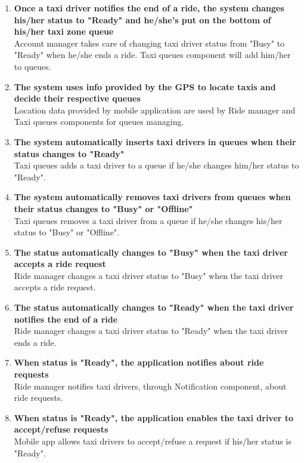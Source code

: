 \begin{enumerate}
	\item \textbf{Once a taxi driver notifies the end of a ride, the system changes his/her status to "Ready" and he/she's put on the bottom of his/her taxi zone queue}\\
	Account manager takes care of changing taxi driver status from "Busy" to "Ready" when he/she ends a ride. Taxi queues component will add him/her to queues.
	
	\item \textbf{The system uses info provided by the GPS to locate taxis and decide their respective queues}\\
	Location data provided by mobile application are used by Ride manager and Taxi queues components for queues managing.
	
	\item \textbf{The system automatically inserts taxi drivers in queues when their status changes to "Ready"}\\
	Taxi queues adds a taxi driver to a queue if he/she changes him/her status to "Ready".
	
	\item \textbf{The system automatically removes taxi drivers from queues when their status changes to "Busy" or "Offline"}\\
	Taxi queues removes a taxi driver from a queue if he/she changes his/her status to "Busy" or "Offline".
	
	\item \textbf{The status automatically changes to "Busy" when the taxi driver accepts a ride request}\\
	Ride manager changes a taxi driver status to "Busy" when the taxi driver accepts a ride request.
	
	\item \textbf{The status automatically changes to "Ready" when the taxi driver notifies the end of a ride}\\
	Ride manager changes a taxi driver status to "Ready" when the taxi driver ends a ride.
	
	\item \textbf{When status is "Ready", the application notifies about ride requests}\\
	Ride manager notifies taxi drivers, through Notification component, about ride requests.
	
	\item \textbf{When status is "Ready", the application enables the taxi driver to accept/refuse requests}\\
	Mobile app allows taxi drivers to accept/refuse a request if his/her status is "Ready".
	

\end{enumerate}
